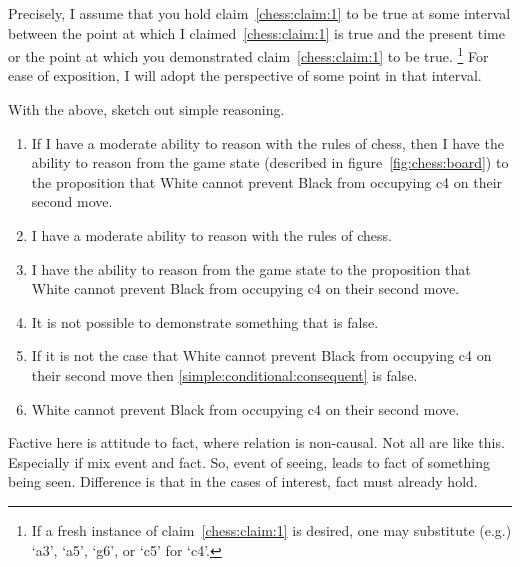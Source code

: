 \documentclass[10pt]{article}
\begin{document}
Precisely, I assume that you hold claim~\ref{chess:claim:1} to be true at some interval between the point at which I claimed~\ref{chess:claim:1} is true and the present time or the point at which you demonstrated claim~\ref{chess:claim:1} to be true.\nolinebreak
\footnote{
  If a fresh instance of claim~\ref{chess:claim:1} is desired, one may substitute (e.g.) `a3', `a5', `g6', or `c5' for `c4'.
}
For ease of exposition, I will adopt the perspective of some point in that interval.

\begin{note}
  With the above, sketch out simple reasoning.
 {
   \color{red}
   \begin{enumerate}
   \item\label{simple:conditional:claim} If I have a moderate ability to reason with the rules of chess, then I have the ability to reason from the game state (described in figure~\ref{fig:chess:board}) to the proposition that White cannot prevent Black from occupying c4 on their second move.
   \item\label{simple:conditional:antecedent} I have a moderate ability to reason with the rules of chess.
   \item\label{simple:conditional:consequent} I have the ability to reason from the game state to the proposition that White cannot prevent Black from occupying c4 on their second move.
   \item\label{simple:conditional:factive-demonstration} It is not possible to demonstrate something that is false.
   \item\label{simple:conditional:necessity} If it is not the case that White cannot prevent Black from occupying c4 on their second move then \ref{simple:conditional:consequent} is false.
   \item\label{simple:conditional:focus} White cannot prevent Black from occupying c4 on their second move.
   \end{enumerate}
 }
\end{note}

\begin{note}
  Factive here is attitude to fact, where relation is non-causal.
  Not all are like this.
  Especially if mix event and fact.
  So, event of seeing, leads to fact of something being seen.
  Difference is that in the cases of interest, fact must already hold.
\end{note}
\end{document}
